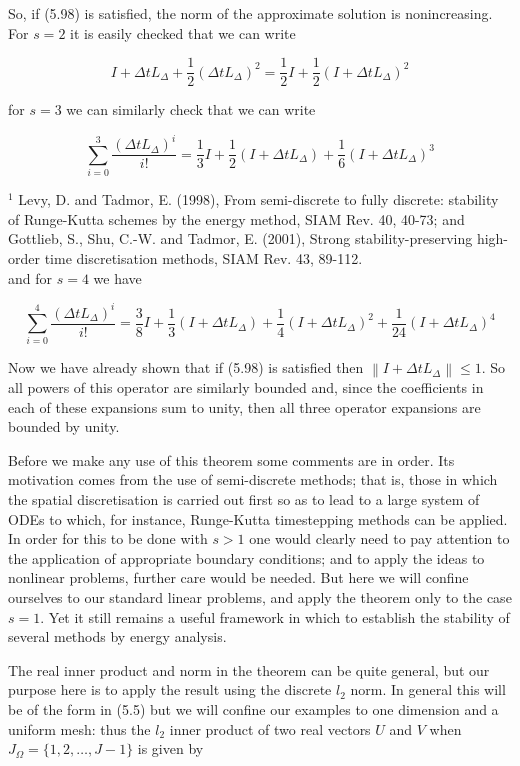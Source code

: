 \documentclass[10pt]{article}
\begin{document}
So, if (5.98) is satisfied, the norm of the approximate solution is nonincreasing. For \(s=2\) it is easily checked that we can write

\[
I+\Delta t L_{\Delta}+\frac{1}{2}\left(\Delta t L_{\Delta}\right)^{2}=\frac{1}{2} I+\frac{1}{2}\left(I+\Delta t L_{\Delta}\right)^{2}
\]

for \(s=3\) we can similarly check that we can write

\[
\sum_{i=0}^{3} \frac{\left(\Delta t L_{\Delta}\right)^{i}}{i!}=\frac{1}{3} I+\frac{1}{2}\left(I+\Delta t L_{\Delta}\right)+\frac{1}{6}\left(I+\Delta t L_{\Delta}\right)^{3}
\]

\({ }^{1}\) Levy, D. and Tadmor, E. (1998), From semi-discrete to fully discrete: stability of Runge-Kutta schemes by the energy method, SIAM Rev. 40, 40-73; and Gottlieb, S., Shu, C.-W. and Tadmor, E. (2001), Strong stability-preserving high-order time discretisation methods, SIAM Rev. 43, 89-112.\\
and for \(s=4\) we have

\[
\sum_{i=0}^{4} \frac{\left(\Delta t L_{\Delta}\right)^{i}}{i!}=\frac{3}{8} I+\frac{1}{3}\left(I+\Delta t L_{\Delta}\right)+\frac{1}{4}\left(I+\Delta t L_{\Delta}\right)^{2}+\frac{1}{24}\left(I+\Delta t L_{\Delta}\right)^{4}
\]

Now we have already shown that if (5.98) is satisfied then \(\left\|I+\Delta t L_{\Delta}\right\| \leq 1\). So all powers of this operator are similarly bounded and, since the coefficients in each of these expansions sum to unity, then all three operator expansions are bounded by unity.

Before we make any use of this theorem some comments are in order. Its motivation comes from the use of semi-discrete methods; that is, those in which the spatial discretisation is carried out first so as to lead to a large system of ODEs to which, for instance, Runge-Kutta timestepping methods can be applied. In order for this to be done with \(s>1\) one would clearly need to pay attention to the application of appropriate boundary conditions; and to apply the ideas to nonlinear problems, further care would be needed. But here we will confine ourselves to our standard linear problems, and apply the theorem only to the case \(s=1\). Yet it still remains a useful framework in which to establish the stability of several methods by energy analysis.

The real inner product and norm in the theorem can be quite general, but our purpose here is to apply the result using the discrete \(l_{2}\) norm. In general this will be of the form in (5.5) but we will confine our examples to one dimension and a uniform mesh: thus the \(l_{2}\) inner product of two real vectors \(U\) and \(V\) when \(J_{\Omega}=\{1,2, \ldots, J-1\}\) is given by
\end{document}
